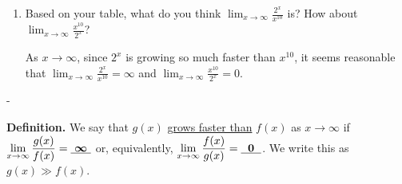 \documentclass{article}
\makeatletter
\newlength{\tipmargin}
\renewenvironment{framed}{
  \setlength{\tipmargin}{\textwidth-\linewidth}
  \advance\@totalleftmargin-\tipmargin
  \def\FrameCommand{\hspace{\tipmargin}\fbox}%
  \advance\linewidth\tipmargin
  \MakeFramed {\advance\hsize-\width \FrameRestore}%
}
{\endMakeFramed}
\makeatother
\begin{document}
\begin{enumerate}
\begin{enumerate}
    \begin{problem}[\vfill]
      Does this change your answer to (a)?
    \end{problem}

    \begin{solution}
      We can see that $2^x$ is initially smaller than $x^{10}$,
      but it eventually grows to be much, much larger than $x^{10}$.
      We write this as $2^x \gg x^{10}$. The graph in part (a)
      ends before showing how $2^x$ overtakes $x^{10}$.
    \end{solution}

  \item

    \begin{problem}[\vfill]
      Based on your table, what do you think $\displaystyle \lim_{x \to \infty} \frac{2^x}{x^{10}}$ is? How about $\displaystyle \lim_{x \to \infty} \frac{x^{10}}{2^x}$?
    \end{problem}

    \begin{solution}
      As $x\to \infty$, since $2^x$ is growing so much faster than
      $x^{10}$, it seems reasonable that 
      $\displaystyle \lim_{x \to \infty} \frac{2^x}{x^{10}} = \infty$
      and
      $\displaystyle \lim_{x \to \infty} \frac{x^{10}}{2^x}=0$.
    \end{solution}

  \end{enumerate}

\end{enumerate}

\begin{problemonly}
  \begin{framed}
    \textbf{Definition.} We say that $g(x)$ \uline{grows faster than} $f(x)$ as $x \to \infty$ if $\displaystyle \lim_{x \to \infty} \frac{g(x)}{f(x)} = \cfitb{0.25in}{\infty}$ or, equivalently, $\displaystyle \lim_{x \to \infty} \frac{f(x)}{g(x)} = \cfitb{0.25in}{0}$. We write this as $g(x) \gg f(x)$.
  \end{framed}
\end{problemonly}

\pspace{\newpage}
\end{document}
